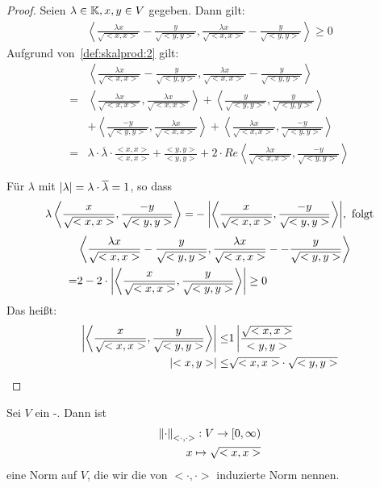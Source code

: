 \begin{proof}
	Seien $\lambda \in \mathbb{K}, x,y \in V$ gegeben. 
	Dann gilt:
	\begin{align*}
		\left< \frac{\lambda x}{\sqrt{<x,x>}} - \frac{y}{\sqrt{<y,y>}} , 
		 \frac{\lambda x}{\sqrt{<x,x>}} - \frac{y}{\sqrt{<y,y>}} \right> \geq 0
	\end{align*}
	Aufgrund von~\ref{def:skalprod:2} gilt:
	\begin{align*}
	 & \left< \frac{\lambda x}{\sqrt{<x,x>}} - \frac{y}{\sqrt{<y,y>}} , 
		 \frac{\lambda x}{\sqrt{<x,x>}} - \frac{y}{\sqrt{<y,y>}} \right> \\
	= &
	\left< \frac{\lambda x}{\sqrt{<x,x>}}, \frac{\lambda x}{\sqrt{<x,x>}} \right> 
		+ \left< \frac{y}{\sqrt{<y,y>}}, \frac{y}{\sqrt{<y,y>}} \right> \\
		& + \left< \frac{-y}{\sqrt{<y,y>}}, \frac{\lambda x}{\sqrt{<x,x>}} \right> 
		+ \left< \frac{\lambda x}{\sqrt{<x,x>}}, \frac{-y}{\sqrt{<y,y>}}\right> \\
	= & \lambda \cdot \overline{\lambda} \cdot \frac{<x,x>}{<x,x>} + \frac{<y,y>}{<y,y>} 
		+ 2 \cdot Re \left< \frac{\lambda x}{\sqrt{<x,x>}}, \frac{-y }{\sqrt{<y,y>}} \right>
	\end{align*}

Für $\lambda$ mit $\abs{\lambda} = \lambda \cdot \overline{\lambda} = 1$, so 
	dass
	\begin{align*}
		\lambda \left< \frac{x}{\sqrt{<x,x>}}, \frac{-y}{\sqrt{<y,y>}} \right>
		= & - \abs{ \left< \frac{x}{\sqrt{<x,x>}}, \frac{-y}{\sqrt{<y,y>}} 
			\right> }, \text{ folgt} \\
	\end{align*}
	\begin{align*}
		& \left< \frac{\lambda x}{\sqrt{<x,x>}} - \frac{y}{\sqrt{<y,y>}} , 
		 \frac{\lambda x}{\sqrt{<x,x>}} - - \frac{y}{\sqrt{<y,y>}} \right> \\
		= & 2 - 2 \cdot \abs{ \left< \frac{x}{\sqrt{<x,x>}}, \frac{y}{\sqrt{<y,y>}} 
		 \right>} \geq 0
	\end{align*} 
	Das heißt:
	\begin{align*}
		\abs{\left< \frac{x}{\sqrt{<x,x>}} , \frac{y}{\sqrt{<y,y>}} \right>} \leq & 1 
		\left\vert \frac{\sqrt{<x,x>}}{<y,y>}\right. \\
		\abs{<x,y>} \leq & \sqrt{<x,x>} \cdot \sqrt{<y,y>}
	\end{align*}
\end{proof}

\begin{Proposition}{%
Sei $V$ ein -. Dann ist
\begin{align*}
	\norm{\cdot}_{<\cdot,\cdot>} : V \rightarrow [0,\infty) \\
	x \mapsto \sqrt{<x,x>}
\end{align*}
eine Norm auf $V$, die wir die von $<\cdot,\cdot>$ induzierte Norm nennen.
}\end{Proposition}

